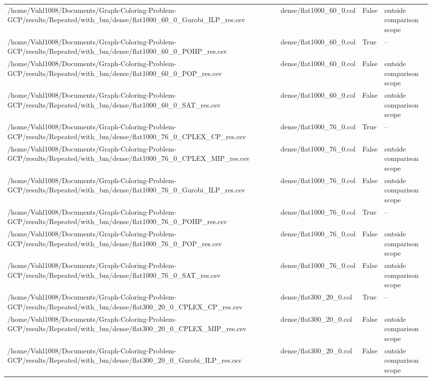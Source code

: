 \begin{table}[htbp]
\begin{tabular}{llll}
/home/Vuhl1008/Documents/Graph-Coloring-Problem-GCP/results/Repeated/with\_bm/dense/flat1000\_60\_0\_Gurobi\_ILP\_res.csv & dense/flat1000\_60\_0.col & False & outside comparison scope \\
/home/Vuhl1008/Documents/Graph-Coloring-Problem-GCP/results/Repeated/with\_bm/dense/flat1000\_60\_0\_POHP\_res.csv & dense/flat1000\_60\_0.col & True & -- \\
/home/Vuhl1008/Documents/Graph-Coloring-Problem-GCP/results/Repeated/with\_bm/dense/flat1000\_60\_0\_POP\_res.csv & dense/flat1000\_60\_0.col & False & outside comparison scope \\
/home/Vuhl1008/Documents/Graph-Coloring-Problem-GCP/results/Repeated/with\_bm/dense/flat1000\_60\_0\_SAT\_res.csv & dense/flat1000\_60\_0.col & False & outside comparison scope \\
/home/Vuhl1008/Documents/Graph-Coloring-Problem-GCP/results/Repeated/with\_bm/dense/flat1000\_76\_0\_CPLEX\_CP\_res.csv & dense/flat1000\_76\_0.col & True & -- \\
/home/Vuhl1008/Documents/Graph-Coloring-Problem-GCP/results/Repeated/with\_bm/dense/flat1000\_76\_0\_CPLEX\_MIP\_res.csv & dense/flat1000\_76\_0.col & False & outside comparison scope \\
/home/Vuhl1008/Documents/Graph-Coloring-Problem-GCP/results/Repeated/with\_bm/dense/flat1000\_76\_0\_Gurobi\_ILP\_res.csv & dense/flat1000\_76\_0.col & False & outside comparison scope \\
/home/Vuhl1008/Documents/Graph-Coloring-Problem-GCP/results/Repeated/with\_bm/dense/flat1000\_76\_0\_POHP\_res.csv & dense/flat1000\_76\_0.col & True & -- \\
/home/Vuhl1008/Documents/Graph-Coloring-Problem-GCP/results/Repeated/with\_bm/dense/flat1000\_76\_0\_POP\_res.csv & dense/flat1000\_76\_0.col & False & outside comparison scope \\
/home/Vuhl1008/Documents/Graph-Coloring-Problem-GCP/results/Repeated/with\_bm/dense/flat1000\_76\_0\_SAT\_res.csv & dense/flat1000\_76\_0.col & False & outside comparison scope \\
/home/Vuhl1008/Documents/Graph-Coloring-Problem-GCP/results/Repeated/with\_bm/dense/flat300\_20\_0\_CPLEX\_CP\_res.csv & dense/flat300\_20\_0.col & True & -- \\
/home/Vuhl1008/Documents/Graph-Coloring-Problem-GCP/results/Repeated/with\_bm/dense/flat300\_20\_0\_CPLEX\_MIP\_res.csv & dense/flat300\_20\_0.col & False & outside comparison scope \\
/home/Vuhl1008/Documents/Graph-Coloring-Problem-GCP/results/Repeated/with\_bm/dense/flat300\_20\_0\_Gurobi\_ILP\_res.csv & dense/flat300\_20\_0.col & False & outside comparison scope \\

\end{tabular}
\end{table}
